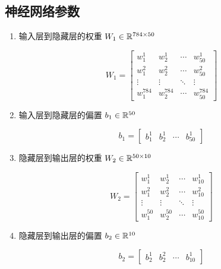 \documentclass[12pt,a4paper]{amsart}
\begin{document}
\subsection{神经网络参数}

\begin{enumerate}
	\item 输入层到隐藏层的权重 $W_1 \in \mathbb{R}^{784 \times 50}$

	\begin{equation}
		W_1 = \begin{bmatrix}
			w_1^1  & w_2^1  & \cdots & w_{50}^1 \\
			w_1^2  & w_2^2  & \cdots & w_{50}^2 \\
			\vdots & \vdots & \ddots & \vdots    \\
			w_1^{784} & w_2^{784} & \cdots & w_{50}^{784}
		\end{bmatrix}
	\end{equation}

	\item 输入层到隐藏层的偏置 $b_1 \in \mathbb{R}^{50}$

	\begin{equation}
		b_1 = \begin{bmatrix}
			b_1^1  & b_2^1  & \cdots & b_{50}^1
		\end{bmatrix}
	\end{equation}

	\item 隐藏层到输出层的权重 $W_2 \in \mathbb{R}^{50 \times 10}$

	\begin{equation}
		W_2 = \begin{bmatrix}
			w_1^1  & w_2^1  & \cdots & w_{10}^1 \\
			w_1^2  & w_2^2  & \cdots & w_{10}^2 \\
			\vdots & \vdots & \ddots & \vdots    \\
			w_1^{50} & w_2^{50} & \cdots & w_{10}^{50}
		\end{bmatrix}
	\end{equation}

	\item 隐藏层到输出层的偏置 $b_2 \in \mathbb{R}^{10}$

	\begin{equation}
		b_2 = \begin{bmatrix}
			b_2^1  & b_2^2  & \cdots & b_{10}^1
		\end{bmatrix}
	\end{equation}

\end{enumerate}
\end{document}
